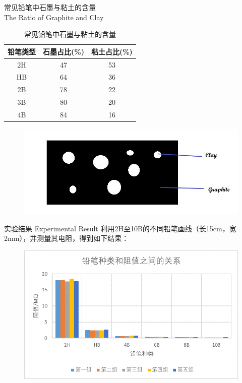 \documentclass[10pt]{beamer}
\begin{document}
	
	\begin{frame}{常见铅笔中石墨与粘土的含量 \\The Ratio of Graphite and Clay}
		\begin{table}[htp]
			\caption{常见铅笔中石墨与粘土的含量}
			\centering
			\begin{tabular}{||c|c|c||}
				\hline
				铅笔类型&石墨占比(\%)&粘土占比(\%) \\ 
				\hline 
				2H&47  &53  \\ 
				\hline 
				HB&64  &36  \\ 
				\hline 
				2B&78  &22  \\ 
				\hline 
				3B&80  &20  \\ 
				\hline 
				4B&84  &16  \\ 
				\hline 
			\end{tabular} 
		\end{table}
		\pause
		\begin{figure}
			\includegraphics[width=0.6\linewidth]{figs/Untitled}
		\end{figure}
	\end{frame}
	
	\begin{frame}{实验结果 Experimental Result}
		利用2H至10B的不同铅笔画线（长15cm，宽2mm），并测量其电阻，得到如下结果：
		\begin{figure}
			\includegraphics[width=0.8\linewidth]{figs/image0}
		\end{figure}
	\end{frame}
	
\end{document}
